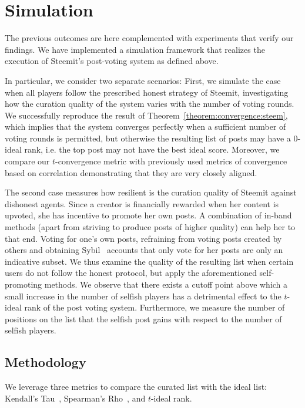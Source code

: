 \section{Simulation}
    The previous outcomes are here complemented with experiments that verify our
    findings. We have implemented a simulation framework that realizes the
    execution of Steemit's post-voting system as defined above.

    In particular, we consider two separate scenarios: First, we simulate the
    case when all players follow the prescribed honest strategy of Steemit,
    investigating how the curation quality of the system varies with the number
    of voting rounds. We successfully reproduce the result of
    Theorem~\ref{theorem:convergence:steem}, which implies that the system
    converges perfectly when a sufficient number of voting rounds is permitted,
    but otherwise the resulting list of posts may have a 0-ideal rank, i.e. the
    top post may not have the best ideal score. Moreover, we compare our
    $t$-convergence metric with previously used metrics of convergence based on
    correlation demonstrating that they are very closely aligned.

    The second case measures how resilient is the curation quality of Steemit
    against dishonest agents. Since a creator is financially rewarded when her
    content is upvoted, she has incentive to promote her own posts. A
    combination of in-band methods (apart from striving to produce posts of
    higher quality) can help her to that end. Voting for one's own posts,
    refraining from voting posts created by others and obtaining
    Sybil~\cite{sybilattack} accounts that only vote for her posts are only an
    indicative subset. We thus examine the quality of the resulting list when
    certain users do not follow the honest protocol, but apply the
    aforementioned self-promoting methods. We observe that there exists a cutoff
    point above which a small increase in the number of selfish players has a
    detrimental effect to the $t$-ideal rank of the post voting system.
    Furthermore, we measure the number of positions on the list that the selfish
    post gains with respect to the number of selfish players.

  \subsection{Methodology}
    We leverage three metrics to compare the curated list with the ideal list:
    Kendall's Tau~\cite{kendall1955rank}, Spearman's
    Rho~\cite{spearman1904proof}, and $t$-ideal rank.

